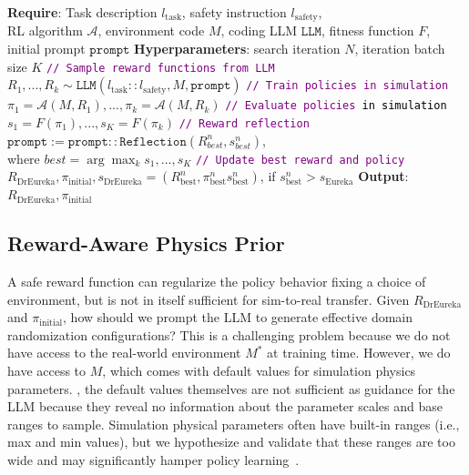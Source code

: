 \documentclass[conference]{IEEEtran}
\newcommand{\jdtext}[1]{\textcolor{black}{#1}}
\begin{document}
\begin{algorithm}[]
\caption{\ourmethod Reward Design}
\label{algo:eureka}
\begin{algorithmic}[1]
\small
\STATE \textbf{Require}: Task description $l_{\text{task}}$, safety instruction $l_{\text{safety}}$, \\ RL algorithm $\mathcal{A}$, environment code $M$, 
coding LLM $\texttt{LLM}$, fitness function $F$, initial prompt $\texttt{prompt}$
\STATE \textbf{Hyperparameters}: search iteration $N$, iteration batch size $K$
\STATE \textcolor{purple}{\texttt{// Sample reward functions from LLM}}
\STATE $R_1,..., R_k \sim \texttt{LLM}(l_{\text{task}}::l_{\text{safety}}, M, \texttt{prompt})$ 
\STATE \textcolor{purple}{\texttt{// Train policies in simulation}}
\STATE $\pi_1 = \mathcal{A}(M, R_1),..., \pi_k = \mathcal{A}(M, R_k)$
\STATE \textcolor{purple}{\texttt{// Evaluate policies \jdtext{in simulation}}}
\STATE $s_1 =F(\pi_1), ..., s_K = F(\pi_k)$
\STATE \textcolor{purple}{\texttt{// Reward reflection}}
\STATE $\texttt{prompt} := \texttt{prompt} :: \texttt{Reflection}(R^n_{best}, s^n_{best})$,\\ 
where $best = \arg \max_{k} s_1,...,s_K$
\STATE \textcolor{purple}{\texttt{// Update best reward and policy}}
\STATE $R_{\text{DrEureka}}, \pi_{\text{initial}}, s_{\text{DrEureka}} = (R^n_{\text{best}}, \pi^n_{\text{best}} s^n_{\text{best}})$, \quad if $s^n_{\text{best}} > s_{\text{Eureka}}$
\ENDFOR
\STATE \textbf{Output}:  $R_{\text{DrEureka}}, \pi_{\text{initial}}$
\end{algorithmic}
\end{algorithm}

\subsection{Reward-Aware Physics Prior}
\label{sec:prior}

A safe reward function can regularize the policy behavior fixing a choice of environment, but is not in itself sufficient for sim-to-real transfer. Given $R_{\text{DrEureka}}$ and $\pi_{\text{initial}}$, how should we prompt the LLM to generate effective domain randomization configurations? This is a challenging problem because we do not have access to the real-world environment $M^*$ at training time. However, we do have access to $M$, which comes with default values for simulation physics parameters. 
, the default values themselves are not sufficient as guidance for the LLM because they reveal no information about the parameter scales and base ranges to sample. Simulation physical parameters often have built-in ranges (i.e., max and min values), but we hypothesize and validate that these ranges are too wide and may significantly hamper policy learning~\citep{vuong2019pick,andrychowicz2020learning}. 
\end{document}
